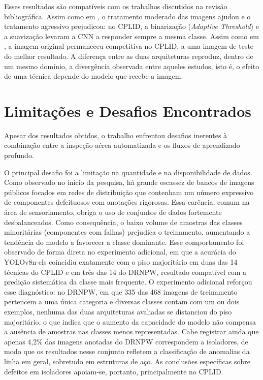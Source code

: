 Esses resultados são compatíveis com os trabalhos discutidos na revisão bibliográfica. Assim como em , o tratamento moderado das imagens ajudou e o tratamento agressivo prejudicou: no CPLID, a binarização (\textit{Adaptive Threshold}) e a suavização levaram a CNN a responder sempre a mesma classe. Assim como em , a imagem original permaneceu competitiva no CPLID, a uma imagem de teste do melhor resultado. A diferença entre as duas arquiteturas reproduz, dentro de um mesmo domínio, a divergência observada entre aqueles estudos, isto é, o efeito de uma técnica depende do modelo que recebe a imagem.

\section{Limitações e Desafios Encontrados}
Apesar dos resultados obtidos, o trabalho enfrentou desafios inerentes à combinação entre a inspeção aérea automatizada e os fluxos de aprendizado profundo.

O principal desafio foi a limitação na quantidade e na disponibilidade de dados. Como observado no início da pesquisa, há grande escassez de bancos de imagens públicos focados em redes de distribuição que contenham um número expressivo de componentes defeituosos com anotações rigorosas. Essa carência, comum na área de sensoriamento, obriga o uso de conjuntos de dados fortemente desbalanceados. Como consequência, o baixo volume de amostras das classes minoritárias (componentes com falhas) prejudica o treinamento, aumentando a tendência do modelo a favorecer a classe dominante. Esse comportamento foi observado de forma direta no experimento adicional, em que a acurácia do YOLOv8n-cls coincidiu exatamente com o piso majoritário em duas das 14 técnicas do CPLID e em três das 14 do DRNPW, resultado compatível com a predição sistemática da classe mais frequente. O experimento adicional reforçou esse diagnóstico: no DRNPW, em que 335 das 468 imagens de treinamento pertencem a uma única categoria e diversas classes contam com um ou dois exemplos, nenhuma das duas arquiteturas avaliadas se distanciou do piso majoritário, o que indica que o aumento da capacidade do modelo não compensa a ausência de amostras nas classes menos representadas. Cabe registrar ainda que apenas 4,2\% das imagens anotadas do DRNPW correspondem a isoladores, de modo que os resultados nesse conjunto refletem a classificação de anomalias da linha em geral, sobretudo em estruturas de aço. As conclusões específicas sobre defeitos em isoladores apoiam-se, portanto, principalmente no CPLID.

